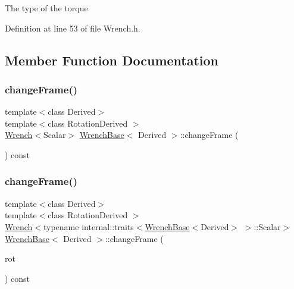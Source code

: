 The type of the torque 

Definition at line 53 of file Wrench.\+h.



\subsection{Member Function Documentation}
\hypertarget{class_wrench_base_a83a6e7bdd6a189a404690657f8ba8b6f}{}\label{class_wrench_base_a83a6e7bdd6a189a404690657f8ba8b6f} 
\subsubsection{\texorpdfstring{change\+Frame()}{changeFrame()}\hspace{0.1cm}{\footnotesize\ttfamily [1/2]}}
{\footnotesize\ttfamily template$<$class Derived$>$ \\
template$<$class Rotation\+Derived $>$ \\
\hyperlink{class_wrench}{Wrench}$<$Scalar$>$ \hyperlink{class_wrench_base}{Wrench\+Base}$<$ Derived $>$\+::change\+Frame (\begin{DoxyParamCaption}\item[{const \hyperlink{class_lie_group_base}{Lie\+Group\+Base}$<$ Quaternion$<$ Scalar $>$, Rotation\+Derived $>$ \&}]{ }\end{DoxyParamCaption}) const\hspace{0.3cm}{\ttfamily [inline]}}

\hypertarget{class_wrench_base_a93689833f79db91100981b4a12a70f3b}{}\label{class_wrench_base_a93689833f79db91100981b4a12a70f3b} 
\subsubsection{\texorpdfstring{change\+Frame()}{changeFrame()}\hspace{0.1cm}{\footnotesize\ttfamily [2/2]}}
{\footnotesize\ttfamily template$<$class Derived$>$ \\
template$<$class Rotation\+Derived $>$ \\
\hyperlink{class_wrench}{Wrench}$<$typename internal\+::traits$<$\hyperlink{class_wrench_base}{Wrench\+Base}$<$Derived$>$ $>$\+::Scalar$>$ \hyperlink{class_wrench_base}{Wrench\+Base}$<$ Derived $>$\+::change\+Frame (\begin{DoxyParamCaption}\item[{const \hyperlink{class_lie_group_base}{Lie\+Group\+Base}$<$ Quaternion$<$ Scalar $>$, Rotation\+Derived $>$ \&}]{rot }\end{DoxyParamCaption}) const\hspace{0.3cm}{\ttfamily [inline]}}



